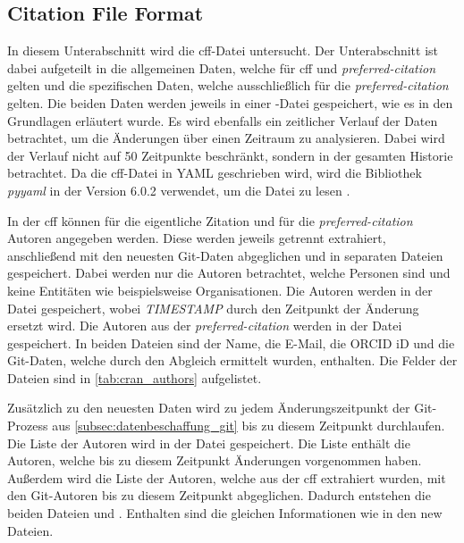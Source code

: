 \subsection{Citation File Format}
\label{subsec:datenbeschaffung_cff}
In diesem Unterabschnitt wird die \gls{cff}-Datei untersucht.
Der Unterabschnitt ist dabei aufgeteilt in die allgemeinen Daten, welche für \gls{cff} und \emph{preferred-citation} gelten und die spezifischen Daten, welche ausschließlich für die \emph{preferred-citation} gelten.
Die beiden Daten werden jeweils in einer -Datei gespeichert, wie es in den Grundlagen erläutert wurde.
Es wird ebenfalls ein zeitlicher Verlauf der Daten betrachtet, um die Änderungen über einen Zeitraum zu analysieren.
Dabei wird der Verlauf nicht auf 50 Zeitpunkte beschränkt, sondern in der gesamten Historie betrachtet.
Da die \gls{cff}-Datei in YAML geschrieben wird, wird die Bibliothek \emph{pyyaml} in der Version 6.0.2 verwendet, um die Datei zu lesen \autocite{simonov_pyyaml_2024}.

In der \gls{cff} können für die eigentliche Zitation und für die \emph{preferred-citation} Autoren angegeben werden.
Diese werden jeweils getrennt extrahiert, anschließend mit den neuesten Git-Daten abgeglichen und in separaten Dateien gespeichert.
Dabei werden nur die Autoren betrachtet, welche Personen sind und keine Entitäten wie beispielsweise Organisationen.
Die Autoren werden in der Datei  gespeichert, wobei \emph{TIMESTAMP} durch den Zeitpunkt der Änderung ersetzt wird.
Die Autoren aus der \emph{preferred-citation} werden in der Datei  gespeichert.
In beiden Dateien sind der Name, die E-Mail, die ORCID iD und die Git-Daten, welche durch den Abgleich ermittelt wurden, enthalten.
Die Felder der Dateien sind in \autoref{tab:cran_authors} aufgelistet.

Zusätzlich zu den neuesten Daten wird zu jedem Änderungszeitpunkt der Git-Prozess aus \autoref{subsec:datenbeschaffung_git} bis zu diesem Zeitpunkt durchlaufen.
Die Liste der Autoren wird in der Datei  gespeichert.
Die Liste enthält die Autoren, welche bis zu diesem Zeitpunkt Änderungen vorgenommen haben.
Außerdem wird die Liste der Autoren, welche aus der \gls{cff} extrahiert wurden, mit den Git-Autoren bis zu diesem Zeitpunkt abgeglichen.
Dadurch entstehen die beiden Dateien  und .
Enthalten sind die gleichen Informationen wie in den \glqq new\grqq{} Dateien.

